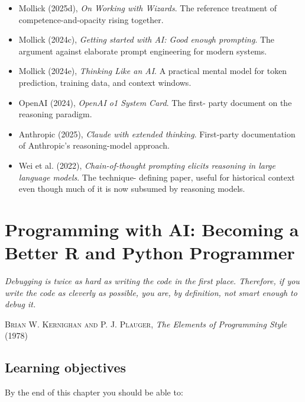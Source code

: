 \documentclass[
  letterpaper,
  11pt]{scrbook}
\providecommand{\tightlist}{%
  \setlength{\itemsep}{0pt}\setlength{\parskip}{0pt}}
\begin{document}
\begin{itemize}
\tightlist
\item
  Mollick (2025d), \emph{On Working with Wizards}. The reference
  treatment of competence-and-opacity rising together.
\item
  Mollick (2024c), \emph{Getting started with AI: Good enough
  prompting}. The argument against elaborate prompt engineering for
  modern systems.
\item
  Mollick (2024e), \emph{Thinking Like an AI}. A practical mental model
  for token prediction, training data, and context windows.
\item
  OpenAI (2024), \emph{OpenAI o1 System Card}. The first- party document
  on the reasoning paradigm.
\item
  Anthropic (2025), \emph{Claude with extended thinking}. First-party
  documentation of Anthropic's reasoning-model approach.
\item
  Wei et al. (2022), \emph{Chain-of-thought prompting elicits reasoning
  in large language models}. The technique- defining paper, useful for
  historical context even though much of it is now subsumed by reasoning
  models.
\end{itemize}

\chapter{Programming with AI: Becoming a Better R and Python
Programmer}\label{sec-ai-programming}

\begin{flushright}\small

\emph{Debugging is twice as hard as writing the code in the first place.
Therefore, if you write the code as cleverly as possible, you are, by
definition, not smart enough to debug it.}

\textsc{Brian W. Kernighan and P. J. Plauger}, \emph{The Elements of
Programming Style} (1978)

\end{flushright}

\section{Learning objectives}\label{learning-objectives-3}

By the end of this chapter you should be able to:
\end{document}
